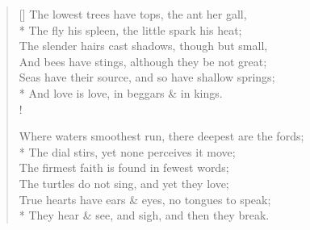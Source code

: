 \documentclass[MAIN]{subfiles}
\begin{document}
\settowidth{\versewidth}{\vin Seas have their source, and so have shallow springs;}
\begin{verse}[\versewidth]
The lowest trees have tops, the ant her gall,\\*
The fly his spleen, the little spark his heat;\\
The slender hairs cast shadows, though but small,\\
And bees have stings, although they be not great;\\
\vin Seas have their source, and so have shallow springs;\\*
\vin And love is love, in beggars \& in kings.\\!

Where waters smoothest run, there deepest are the fords;\\*
The dial stirs, yet none perceives it move;\\
The firmest faith is found in fewest words;\\
The turtles do not sing, and yet they love;\\
\vin True hearts have ears \& eyes, no tongues to speak;\\*
\vin They hear \& see, and sigh, and then they break.
\end{verse}
\end{document}
